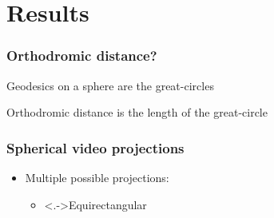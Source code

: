 \section{Results}

\begin{frame}[c]
   \frametitle{Orthodromic distance?}

   Geodesics on a sphere are the great-circles

   Orthodromic distance is the length of the great-circle

   \begin{independentCounter}
      
   \end{independentCounter}

\end{frame}

\begin{frame}[c]
   \frametitle{Spherical video projections}

   \vfill

   \begin{itemize}
      \item<+-> Multiple possible projections:
      \begin{itemize}
         \item \uncover<.->{Equirectangular}
      \end{itemize}
   \end{itemize}

   \vfill

   \begin{independentCounter}
      
   \end{independentCounter}

\end{frame}


